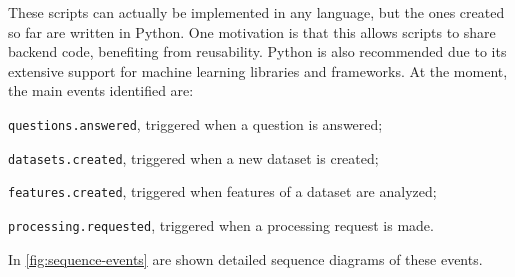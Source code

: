 \documentclass[12pt,a4paper,openright,twoside]{book}
\begin{document}
These scripts can actually be implemented in any language, but the ones created so far are written in Python.
%
One motivation is that this allows scripts to share backend code, benefiting from reusability.
%
Python is also recommended due to its extensive support for machine learning libraries and frameworks.
%
At the moment, the main events identified are:
\begin{enumerate*}[label=(\roman*)]
    \item \texttt{questions.answered}, triggered when a question is answered;
    \item \texttt{datasets.created}, triggered when a new dataset is created;
    \item \texttt{features.created}, triggered when features of a dataset are analyzed;
    \item \texttt{processing.requested}, triggered when a processing request is made.
\end{enumerate*}

In \cref{fig:sequence-events} are shown detailed sequence diagrams of these events. 

\end{document}
